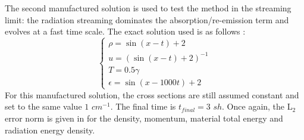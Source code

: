 The second manufactured solution is used to test the method in the streaming limit: the radiation streaming dominates the absorption/re-emission term and evolves at a fast time scale. The exact solution used is as follows :
\begin{equation}
\label{eq:equation14}
\left\{
\begin{array}{llll}
\rho = \sin(x-t)+2 \\
u = \left( \sin(x-t)+2 \right)^{-1} \\
T = 0.5 \gamma \\
\epsilon = \sin(x-1000 t)+2
\end{array}
\right.
\end{equation}
For this manufactured solution, the cross sections are still assumed constant and set to the same value $1$ $cm^{-1}$. The final time is $t_{final}=3$ $sh$. Once again, the L$_2$ error norm is given in  for the density, momentum, material total energy and radiation energy density.
